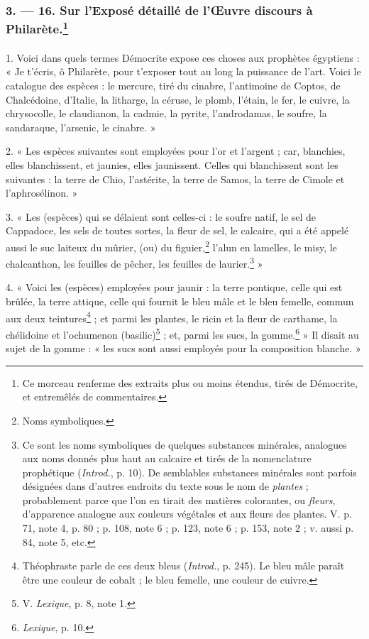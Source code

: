 \documentclass[a4paper, 11pt, oneside, polutonikogreek, french]{article}
\begin{document}
\bigskip
\centerline{\EightStarTaper}
\centerline{\EightStarTaper\EightStarTaper}
\bigskip

\subsubsection[3. --- 16. Sur l'Exposé détaillé de l'Œuvre discours à Philarète.]{3. --- 16. Sur l'Exposé détaillé de l'Œuvre discours à Philarète.\footnote{Ce morceau renferme des extraits plus ou moins étendus, tirés de Démocrite, et entremêlés de commentaires.}}
\paragraph{}
1. Voici dans quels termes Démocrite expose ces choses aux prophètes égyptiens : « Je t'écris, ô Philarète, pour t'exposer tout au long la puissance de l'art. Voici le catalogue des espèces : le mercure, tiré du cinabre, l'antimoine de Coptos, de Chalcédoine, d'Italie, la litharge, la céruse, le plomb, l'étain, le fer, le cuivre, la chrysocolle, le claudianon, la cadmie, la pyrite, l'androdamas, le soufre, la sandaraque, l'arsenic, le cinabre. »

2. « Les espèces suivantes sont employées pour l'or et l'argent ; car, blanchies, elles blanchissent, et jaunies, elles jaunissent. Celles qui blanchissent sont les suivantes : la terre de Chio, l'astérite, la terre de Samos, la terre de Cimole et l'aphrosélinon. »

3. « Les (espèces) qui se délaient sont celles-ci : le soufre natif, le sel de Cappadoce, les sels de toutes sortes, la fleur de sel, le calcaire, qui a été appelé aussi le suc laiteux du mûrier, (ou) du figuier,\footnote{Noms symboliques.} l'alun en lamelles, le misy, le chalcanthon, les feuilles de pêcher, les feuilles de laurier.\footnote{Ce sont les noms symboliques de quelques substances minérales, analogues aux noms donnés plus haut au calcaire et tirés de la nomenclature prophétique (\emph{Introd.}, p. 10). De semblables substances minérales sont parfois désignées dans d'autres endroits du texte sous le nom de \emph{plantes} ; probablement parce que l'on en tirait des matières colorantes, ou \emph{fleurs}, d'apparence analogue aux couleurs végétales et aux fleurs des plantes. V. p. 71, note 4, p. 80 ; p. 108, note 6 ; p. 123, note 6 ; p. 153, note 2 ; v. aussi p. 84, note 5, etc.} »

4. « Voici les (espèces) employées pour jaunir : la terre pontique, celle qui est brûlée, la terre attique, celle qui fournit le bleu mâle et le bleu femelle, commun aux deux teintures\footnote{Théophraste parle de ces deux bleus (\emph{Introd.}, p. 245). Le bleu mâle paraît être une couleur de cobalt ; le bleu femelle, une couleur de cuivre.} ; et parmi les plantes, le ricin et la fleur de carthame, la chélidoine et l'ochumenon (basilic)\footnote{V. \emph{Lexique}, p. 8, note 1.} ; et, parmi les sucs, la gomme.\footnote{\emph{Lexique}, p. 10.} » Il disait au sujet de la gomme : « les sucs sont aussi employés pour la composition blanche. »
\end{document}
